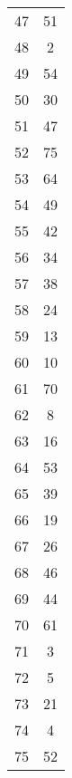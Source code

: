 \begin{table}
\begin{tabular}{c c }
47 & 51 \\
48 & 2 \\
49 & 54 \\
50 & 30 \\
51 & 47 \\
52 & 75 \\
53 & 64 \\
54 & 49 \\
55 & 42 \\
56 & 34 \\
57 & 38 \\
58 & 24 \\
59 & 13 \\
60 & 10 \\
61 & 70 \\
62 & 8 \\
63 & 16 \\
64 & 53 \\
65 & 39 \\
66 & 19 \\
67 & 26 \\
68 & 46 \\
69 & 44 \\
70 & 61 \\
71 & 3 \\
72 & 5 \\
73 & 21 \\
74 & 4 \\
75 & 52 \\
\hline
\end{tabular}
\end{table}